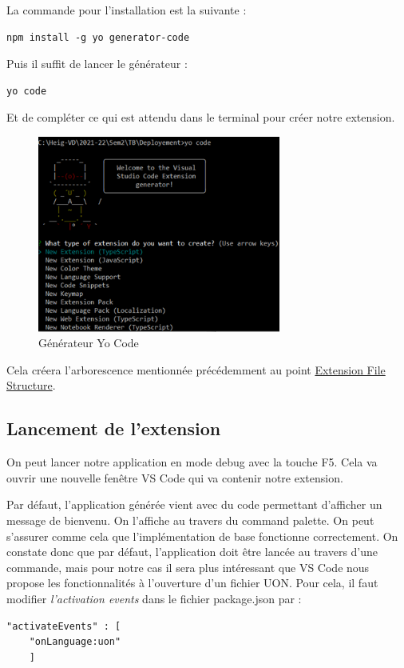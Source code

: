 \documentclass[
    iict, %
    il, %
]{heig-tb}
\begin{document}
La commande pour l'installation est la suivante :

\begin{lstlisting}[frame=single]
npm install -g yo generator-code
\end{lstlisting}

Puis il suffit de lancer le générateur :

\begin{lstlisting}[frame=single]
yo code
\end{lstlisting}

Et de compléter ce qui est attendu dans le terminal pour créer notre extension.

\begin{figure}[!h]
    \begin{center}
        \includegraphics[width=8cm]{assets/figures/yo-code.png}
    \end{center}
    \caption[Générateur Yo Code]{\label{yo-code}Générateur Yo Code}
\end{figure}

Cela créera l'arborescence mentionnée précédemment au point \hyperref[Extension File Structure]{Extension File Structure}.

\subsection{Lancement de l'extension}
On peut lancer notre application en mode debug avec la touche F5. Cela va ouvrir une nouvelle fenêtre VS Code qui va contenir notre extension.

Par défaut, l'application générée vient avec du code permettant d'afficher un message de bienvenu. On l'affiche au travers du command palette. On peut s'assurer comme cela que l'implémentation de base fonctionne correctement.
On constate donc que par défaut, l'application doit être lancée au travers d'une commande, mais pour notre cas il sera plus intéressant que VS Code nous propose les fonctionnalités à l'ouverture d'un fichier UON.
Pour cela, il faut modifier \emph{l'activation events} dans le fichier package.json par :
\begin{lstlisting}[frame=single]
    "activateEvents" : [
	"onLanguage:uon"
    ]
\end{lstlisting}
\end{document}
